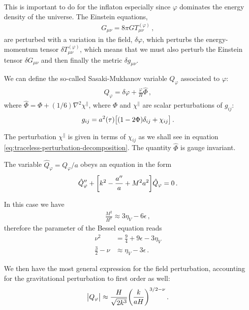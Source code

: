 \documentclass[main.tex]{subfiles}
\begin{document}
This is important to do for the inflaton especially since \(\varphi \) dominates the energy density of the universe. 
The Einstein equations, 
%
\begin{align}
G_{\mu \nu } = 8 \pi G T_{\mu \nu }^{(\varphi )}
\,,
\end{align}
%
are perturbed with a variation in the field, \(\delta \varphi \), which perturbs the energy-momentum tensor \(\delta T_{\mu \nu }^{(\varphi )}\), which means that we must also perturb the Einstein tensor \(\delta G_{\mu \nu} \) and then finally the metric \(\delta g_{\mu \nu }\). 

We can define the so-called Sasaki-Mukhanov variable \(Q_\varphi \) associated to \(\varphi \):
%
\begin{align}
Q_\varphi = \delta \varphi + \frac{\varphi }{H} \hat{\Phi}
\,,
\end{align}
%
where \(\hat{\Phi} = \Phi + (1/6) \nabla^2 \chi^{\parallel}\), where \(\Phi \) and \(\chi^{\parallel}\) are scalar perturbations of \(g_{ij}\): 
%
\begin{align}
g_{ij} = a^2(\tau ) \qty[(1 - 2 \Phi ) \delta_{ij} + \chi_{ij}]
\,.
\end{align}

The perturbation \(\chi^{\parallel}\) is given in terms of \(\chi_{ij}\) as we shall see in equation \eqref{eq:traceless-perturbation-decomposition}.
The quantity \(\hat{\Phi}\) is gauge invariant.

The variable \(\hat{Q}_\varphi  = Q_\varphi / a\) obeys an equation in the form 
%
\begin{align}
\hat{Q}_\varphi '' + \qty[ k^2 - \frac{a''}{a} + M^2a^2] \hat{Q}_\varphi  = 0
\,.
\end{align}

In this case we have 
%
\begin{align}
\frac{M^2}{H^2} \approx 3 \eta _V - 6 \epsilon 
\,,
\end{align}
%
therefore the parameter of the Bessel equation reads
%
\begin{align}
\nu^2 &= \frac{9}{4} + 9 \epsilon - 3 \eta _V  \\
\frac{3}{2} - \nu  &\approx \eta _V - 3 \epsilon 
\,.
\end{align}

We then have the most general expression for the field perturbation, accounting for the gravitational perturbation to first order as well:
%
\begin{align}
\abs{ Q_\varphi} \approx \frac{H}{\sqrt{2 k^3}} \qty( \frac{k}{aH})^{3/2 - \nu }
\,.
\end{align}
\end{document}
